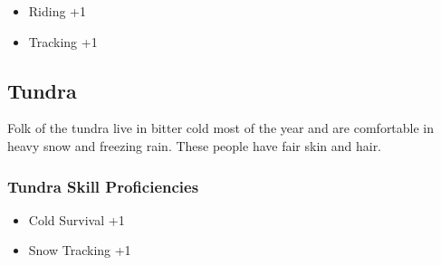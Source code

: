 \begin{multicols}{2}
\begin{itemize}
    \item Riding +1
    \item Tracking +1
\end{itemize}

\subsection{Tundra}

Folk of the tundra live in bitter cold most of the year and are comfortable
in heavy snow and freezing rain. These people have fair skin and hair.

\subsubsection{Tundra Skill Proficiencies}

\begin{itemize}
    \item Cold Survival +1
    \item Snow Tracking +1
\end{itemize}

\end{multicols}
